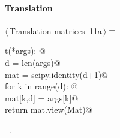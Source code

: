 \documentclass[11pt,oneside]{article}	%
\begin{document}
\paragraph{Translation}
\begin{flushleft} \small \label{scrap21}
\protect{}$\langle\,$Translation matrices\nobreak\ {\footnotesize 11a}$\,\rangle\equiv$
\vspace{-1ex}
\begin{list}{}{} \item
\mbox{}\verb@def t(*args): @\\
\mbox{}\verb@   d = len(args)@\\
\mbox{}\verb@   mat = scipy.identity(d+1)@\\
\mbox{}\verb@   for k in range(d): @\\
\mbox{}\verb@      mat[k,d] = args[k]@\\
\mbox{}\verb@   return mat.view(Mat)@\\
\mbox{}\verb@@{\NWsep}
\end{list}
\vspace{-1ex}
\footnotesize\addtolength{\baselineskip}{-1ex}
\begin{list}{}{\setlength{\itemsep}{-\parsep}\setlength{\itemindent}{-\leftmargin}}
\item \NWtxtMacroRefIn\ .
\end{list}
\end{flushleft}
\end{document}
